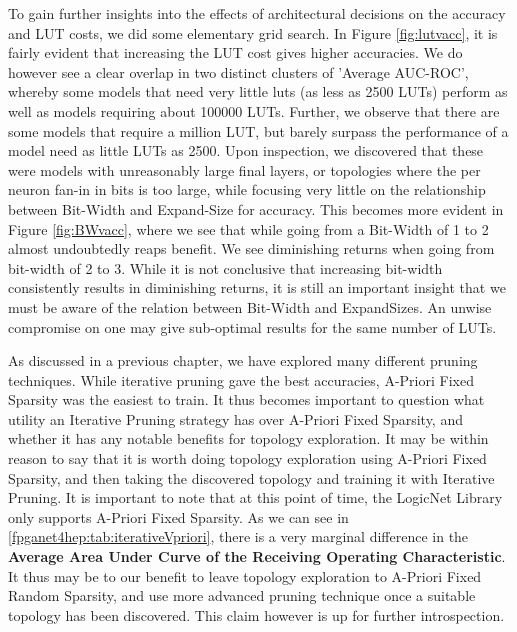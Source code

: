 To gain further insights into the effects of architectural decisions on the accuracy and LUT costs, we did some elementary grid search.
In Figure \cref{fig:lutvacc}, it is fairly evident that increasing the LUT cost gives higher accuracies. We do however see a clear overlap in two distinct clusters of 'Average AUC-ROC', whereby some models that need very little luts (as less as 2500 LUTs) perform as well as models requiring about 100000 LUTs. Further, we observe that there are some models that require a million LUT, but barely surpass the performance of a model need as little LUTs as 2500. Upon inspection, we discovered that these were models with unreasonably large final layers, or topologies where the per neuron fan-in in bits is too large, while focusing very little on the relationship between Bit-Width and Expand-Size for accuracy.
This becomes more evident in Figure \cref{fig:BWvacc}, where we see that while going from a Bit-Width of 1 to 2 almost undoubtedly reaps benefit. We see diminishing returns when going from bit-width of 2 to 3. While it is not conclusive that increasing bit-width consistently results in diminishing returns, it is still an important insight that we must be aware of the relation between Bit-Width and ExpandSizes. An unwise compromise on one may give sub-optimal results for the same number of LUTs. 

As discussed in a previous chapter, we have explored many different pruning techniques. While iterative pruning gave the best accuracies, A-Priori Fixed Sparsity was the easiest to train. It thus becomes important to question what utility an Iterative Pruning strategy has over A-Priori Fixed Sparsity, and whether it has any notable benefits for topology exploration. It may be within reason to say that it is worth doing topology exploration using A-Priori Fixed Sparsity, and then taking the discovered topology and training it with Iterative Pruning. It is important to note that at this point of time, the LogicNet Library only supports A-Priori Fixed Sparsity. 
As we can see in \cref{fpganet4hep:tab:iterativeVpriori}, there is a very marginal difference in the \textbf{Average Area Under Curve of the Receiving Operating Characteristic}. 
It thus may be to our benefit to leave topology exploration to A-Priori Fixed Random Sparsity, and use more advanced pruning technique once a suitable topology has been discovered. This claim however is up for further introspection. 


